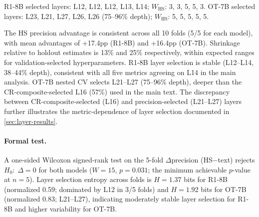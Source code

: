 \begin{table}[htbp]
\centering
\small
\caption{Nested 5-fold CV: per-fold HS$-$text precision difference (pp). Layer and $W$ selected independently per fold. All 10/10 folds favor HS.}
\label{tab:nested_cv}
\setlength{\tabcolsep}{4pt}
\begin{flushleft}
\scriptsize R1-8B selected layers: L12, L12, L12, L13, L14; $W_\text{HS}$: 3, 3, 5, 5, 3. OT-7B selected layers: L23, L21, L27, L26, L26 (75--96\% depth); $W_\text{HS}$: 5, 5, 5, 5, 5.
\end{flushleft}
\end{table}

The HS precision advantage is consistent across all 10 folds (5/5 for each model), with mean advantages of +17.4pp (R1-8B) and +16.4pp (OT-7B). Shrinkage relative to holdout estimates is 13\% and 25\% respectively, within expected ranges for validation-selected hyperparameters. R1-8B layer selection is stable (L12--L14, 38--44\% depth), consistent with all five metrics agreeing on L14 in the main analysis. OT-7B nested CV selects L21--L27 (75--96\% depth), deeper than the CR-composite-selected L16 (57\%) used in the main text. The discrepancy between CR-composite-selected (L16) and precision-selected (L21--L27) layers further illustrates the metric-dependence of layer selection documented in \cref{sec:layer-results}.

\paragraph{Formal test.} A one-sided Wilcoxon signed-rank test on the 5-fold $\Delta$precision (HS$-$text) rejects $H_0{:}\;\Delta{=}0$ for both models ($W{=}15$, $p{=}0.031$; the minimum achievable $p$-value at $n{=}5$). Layer selection entropy across folds is $H{=}1.37$ bits for R1-8B (normalized 0.59; dominated by L12 in 3/5 folds) and $H{=}1.92$ bits for OT-7B (normalized 0.83; L21--L27), indicating moderately stable layer selection for R1-8B and higher variability for OT-7B.

